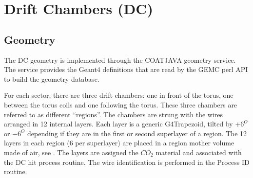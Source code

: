 \section{Drift Chambers (DC)}

\subsection{Geometry}

The DC geometry is implemented through the COATJAVA geometry service.
The service provides the Geant4 definitions that are read by the GEMC perl API to build the geometry database.

For each sector, there are three drift chambers: one in front of the torus, one between the torus coils
and one following the torus.  These three chambers are referred to as different ``regions''.
The chambers are strung with the wires arranged in 12 internal layers.
Each layer is a generic G4Trapezoid, tilted by $+6^O$ or $-6^O$ depending if they are in the first or second
superlayer of a region.
The 12 layers in each region (6 per superlayer) are placed in a region mother volume made of air, see .
The layers are assigned the $CO_2$ material and associated with the DC hit process routine.
The wire identification is performed in the Process ID routine.

